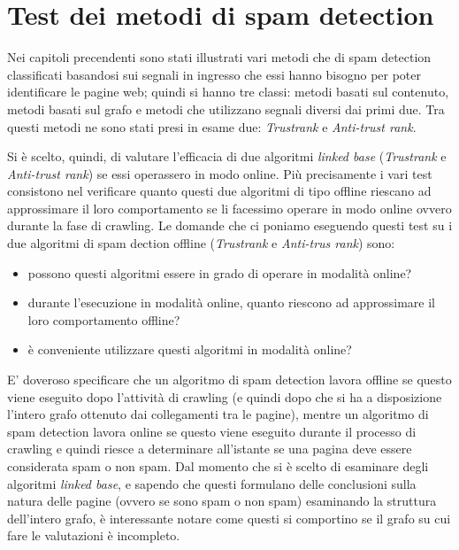 \chapter{Test dei metodi di spam detection}
Nei capitoli precendenti sono stati illustrati vari metodi che di spam detection classificati basandosi sui segnali in ingresso che essi hanno bisogno per poter identificare le pagine web; quindi si hanno tre classi: metodi basati sul contenuto, metodi basati sul grafo e metodi che utilizzano segnali diversi dai primi due. Tra questi metodi ne sono stati presi in esame due: \textit{Trustrank} e \textit{Anti-trust rank}. 

Si è scelto, quindi, di valutare l'efficacia di due  algoritmi \textit{linked base} (\textit{Trustrank} e \textit{Anti-trust rank}) se essi operassero in modo online. Più precisamente i vari test consistono nel verificare quanto questi due algoritmi di tipo offline riescano ad approssimare il loro comportamento se li facessimo operare in modo online ovvero durante la fase di crawling. Le domande che ci poniamo eseguendo questi test su i due algoritmi di spam dection offline (\textit{Trustrank} e \textit{Anti-trus rank}) sono:
\begin{itemize}
 \item possono questi algoritmi essere in grado di operare in modalità online?
 \item durante l'esecuzione in modalità online, quanto riescono ad approssimare il loro comportamento offline?
 \item è conveniente utilizzare questi algoritmi in modalità online?
\end{itemize}

E' doveroso specificare che un algoritmo di spam detection lavora offline se questo viene eseguito dopo l'attività di crawling (e quindi dopo che si ha a disposizione l'intero grafo ottenuto dai collegamenti tra le pagine), mentre un algoritmo di spam detection lavora online se questo viene eseguito durante il processo di crawling e quindi riesce a determinare all'istante se una pagina deve essere considerata spam o non spam. Dal momento che si è scelto di esaminare degli algoritmi \textit{linked base}, e sapendo che questi formulano delle conclusioni sulla natura delle pagine (ovvero se sono spam o non spam) esaminando la struttura dell'intero grafo, è interessante notare come questi si comportino se il grafo su cui fare le valutazioni è incompleto.

